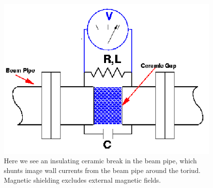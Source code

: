 \begin{figure}
\begin{center}
\includegraphics[width=0.75\linewidth]{./figures/wcm_schematic_cartoon}
\caption{ Here we see an insulating ceramic break in the beam pipe, which shunts image
wall currents from the beam pipe around the toriud. Magnetic shielding excludes external
magnetic fields.~\cite{kawallfocus2005} }
\label{fig:wcm_schematic_cartoon}
\end{center}
\end{figure}
